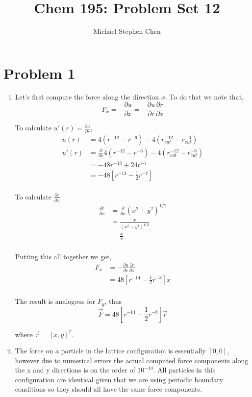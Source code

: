 \documentclass{article}
\title{Chem 195: Problem Set 12}
\author{Michael Stephen Chen}
\begin{document}
\maketitle
\pagebreak

\section*{Problem 1}
\begin{enumerate}[i.]
  \item Let's first compute the force along the direction $x$. To do that we note that,
    $$F_x = -\frac{\partial u}{\partial x} = -\frac{\partial u}{\partial r}\frac{\partial r}{\partial x}$$

    To calculate $u'(r) = \frac{\partial u}{\partial r}$,
    \begin{align}
      u(r) &= 4(r^{-12} - r^{-6}) - 4(r_{cut}^{-12}-r_{cut}^{-6}) \\
      u'(r) &= \frac{\partial}{\partial r} 4(r^{-12} - r^{-6}) - 4(r_{cut}^{-12}-r_{cut}^{-6}) \\
      &= -48r^{-13} + 24r^{-7} \\
      &= -48 \left[ r^{-13} - \frac{1}{2}r^{-7} \right] \\
    \end{align}

    To calculate $\frac{\partial r}{\partial x}$
    \begin{align}
      \frac{\partial r}{\partial x} &= \frac{\partial}{\partial x} (x^2 + y^2)^{1/2} \\
      &= \frac{x}{(x^2 + y^2)^{1/2}} \\
      &= \frac{x}{r} \\
    \end{align}

    Putting this all together we get,
    \begin{align}
      F_x &= -\frac{\partial u}{\partial r}\frac{\partial r}{\partial x}\\
      &= 48 \left[ r^{-14} - \frac{1}{2}r^{-8} \right] x \\
    \end{align}

    The result is analogous for $F_y$, thus
    $$\vec{F} = 48 \left[ r^{-14} - \frac{1}{2}r^{-8} \right] \vec{r}$$

    where $\vec{r} = \left[ x, y \right]^T$.

  \item The force on a particle in the lattice configuration is essentially $\left[0, 0 \right]$, however due to numerical errors the actual computed force components along the x and y directions is on the order of $10^{-14}$. All particles in this configuration are identical given that we are using periodic boundary conditions so they should all have the same force components.


\end{enumerate}
\end{document}
